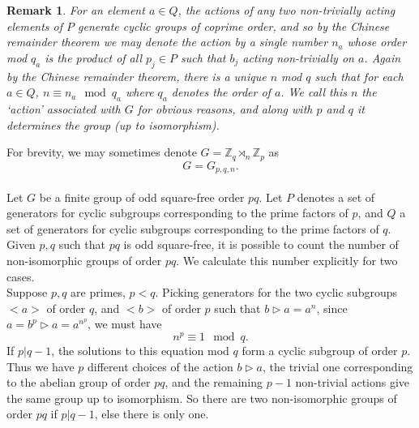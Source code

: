 \documentclass[a4paper, 10pt]{book}
\newtheorem{Rem}[theorem]{Remark}
\theoremstyle{definition}
\numberwithin{equation}{chapter}
\newcommand\hit{\triangleright}
\newcommand\ZZ{\mathbb Z}
\newcommand\semidir\rtimes
\begin{document}
\begin{Rem}\label{chinese}\rm
For an element $a\in Q$, the actions of any two non-trivially acting elements of $P$ generate cyclic groups of coprime order, and so by the Chinese remainder theorem we may denote the action by a single number $n_a$ whose order mod $q_a$ is the product of all $p_j\in P$ such that $b_j$ acting non-trivially on $a$. Again by the Chinese remainder theorem, there is a unique $n$ mod $q$ such that for each $a \in Q$, $n\equiv n_a \mod q_a$ where $q_a$ denotes the order of $a$. We call this $n$ the `action' associated with $G$ for obvious reasons, and along with $p$ and $q$ it determines the group (up to isomorphism).
\end{Rem}
For brevity, we may sometimes denote $G=\ZZ_q\semidir_n\ZZ_p$ as \begin{equation*}
	G = G_{p,q,n}.
\end{equation*}\\
Let $G$ be a finite group of odd square-free order $pq$. Let $P$ denotes a set of generators for cyclic subgroups corresponding to the prime factors of $p$, and $Q$ a set of generators for cyclic subgroups corresponding to the prime factors of $q$. 
Given $p,q$ such that $pq$ is odd square-free, it is possible to count the number of non-isomorphic groups of order $pq$. We calculate this number explicitly for two cases.\\
Suppose $p, q$ are primes, $p<q$. Picking generators for the two cyclic subgroups $<a>$ of order $q$, and $<b>$ of order $p$ such that $b\hit a=a^n$, since $a = b^p\hit a = a^{n^p}$, we must have\begin{equation*}
	n^p\equiv 1 \mod q.
\end{equation*} If $p|q-1$, the solutions to this equation mod $q$ form a cyclic subgroup of order $p$. Thus we have $p$ different choices of the action $b\hit a$, the trivial one corresponding to the abelian group of order $pq$, and the remaining $p-1$ non-trivial actions give the same group up to isomorphism. So there are two non-isomorphic groups of order $pq$ if $p|q-1$, else there is only one.
\end{document}
